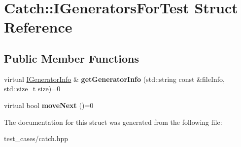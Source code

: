 \hypertarget{structCatch_1_1IGeneratorsForTest}{}\section{Catch\+:\+:I\+Generators\+For\+Test Struct Reference}
\label{structCatch_1_1IGeneratorsForTest}
\subsection*{Public Member Functions}
\begin{DoxyCompactItemize}
\item 
\mbox{\label{structCatch_1_1IGeneratorsForTest_a180d84e858840188e4c3788e47eefdb0}} 
virtual \hyperlink{structCatch_1_1IGeneratorInfo}{I\+Generator\+Info} \& {\bfseries get\+Generator\+Info} (std\+::string const \&file\+Info, std\+::size\+\_\+t size)=0
\item 
\mbox{\label{structCatch_1_1IGeneratorsForTest_adab31832d529fc584fd63164e0a1c8ad}} 
virtual bool {\bfseries move\+Next} ()=0
\end{DoxyCompactItemize}


The documentation for this struct was generated from the following file\+:\begin{DoxyCompactItemize}
\item 
test\+\_\+cases/catch.\+hpp\end{DoxyCompactItemize}
